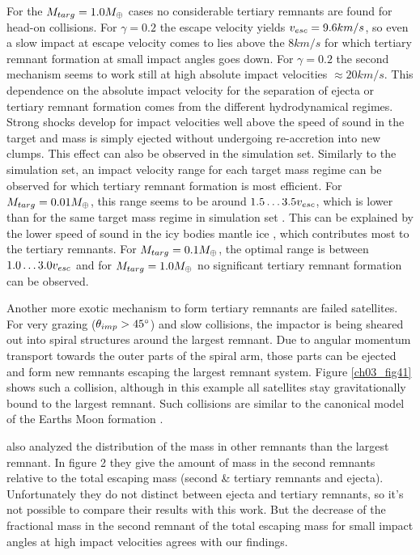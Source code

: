 For the $M_{targ} = 1.0 M_{\oplus}$ cases no considerable tertiary remnants are found for head-on collisions. For $\gamma = 0.2$ the escape velocity yields $v_{esc} = 9.6 km/s$, so even a slow impact at escape velocity comes to lies above the $8 km/s$ for which tertiary remnant formation at small impact angles goes down. For $\gamma = 0.2$ the second mechanism seems to work still at high absolute impact velocities $\approx 20km/s$. This dependence on the absolute impact velocity for the separation of ejecta or tertiary remnant formation comes from the different hydrodynamical regimes. Strong shocks develop for impact velocities well above the speed of sound in the target and mass is simply ejected without undergoing re-accretion into new clumps. This effect can also be observed in the \iss simulation set. Similarly to the \css simulation set, an impact velocity range for each target mass regime can be observed for which tertiary remnant formation is most efficient. For $M_{targ} = 0.01 M_{\oplus}$, this range seems to be around $1.5 \dots 3.5 v_{esc}$, which is lower than for the same target mass regime in simulation set \css. This can be explained by the lower speed of sound in the icy bodies mantle ice \citep{Stewart:2003p2802}, which contributes most to the tertiary remnants. For $M_{targ} = 0.1 M_{\oplus}$, the optimal range is between $1.0 \dots 3.0 v_{esc}$ and for $M_{targ} = 1.0 M_{\oplus}$ no significant tertiary remnant formation can be observed.

Another more exotic mechanism to form tertiary remnants are failed satellites. For very grazing ($\theta_{imp} > 45 ^\circ$) and slow collisions, the impactor is being sheared out into spiral structures around the largest remnant. Due to angular momentum transport towards the outer parts of the spiral arm, those parts can be ejected and form new remnants escaping the largest remnant system. Figure \ref{ch03_fig41} shows such a collision, although in this example all satellites stay gravitationally bound to the largest remnant. Such collisions are similar to the canonical model of the Earths Moon formation \citep{Benz:1985p1755}.

\cite{Agnor:2004p3329} also analyzed the distribution of the mass in other remnants than the largest remnant. In figure 2 they give the amount of mass in the second remnants relative to the total escaping mass (second \& tertiary remnants and ejecta). Unfortunately they do not distinct between ejecta and tertiary remnants, so it's not possible to compare their results with this work. But the decrease of the fractional mass in the second remnant of the total escaping mass for small impact angles at high impact velocities agrees with our findings.

